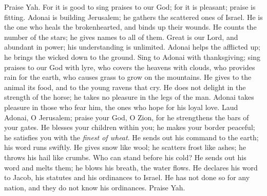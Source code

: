 \begin{biblechapter} %
 Praise Yah. 
For it is good to sing praises to our God; 
for it is pleasant; praise is fitting.
\verse Adonai is building Jerusalem; 
he gathers the scattered ones of Israel.
\verse He is the one who heals the brokenhearted, 
and binds up their wounds.
\verse He counts the number of the stars; 
he gives names to all of them.
\verse Great is our Lord, and abundant in power; 
his understanding is unlimited.
\verse Adonai helps the afflicted up; 
he brings the wicked down to the ground.
\verse Sing to Adonai with thanksgiving; 
sing praises to our God with lyre,
\verse who covers the heavens with clouds, 
who provides rain for the earth, 
who causes grass to grow on the mountains.
\verse He gives to the animal its food, 
and to the young ravens that cry.
\verse He does not delight in the strength of the horse; 
he takes no pleasure in the legs of the man.
\verse Adonai takes pleasure in those who fear him, 
the ones who hope for his loyal love.
\verse Laud Adonai, O Jerusalem; 
praise your God, O Zion,
\verse for he strengthens the bars of your gates. 
He blesses your children within you;
\verse he makes your border peaceful; 
he satisfies you with the \textit{finest of wheat}.
\verse He sends out his command to the earth; 
his word runs swiftly.
\verse He gives snow like wool; 
he scatters frost like ashes;
\verse he throws his hail like crumbs. 
Who can stand before his cold?
\verse He sends out his word and melts them; 
he blows his breath, the water flows.
\verse He declares his word to Jacob, 
his statutes and his ordinances to Israel.
\verse He has not done so for any nation, 
and they do not know his ordinances. 
Praise Yah.
\end{biblechapter}

